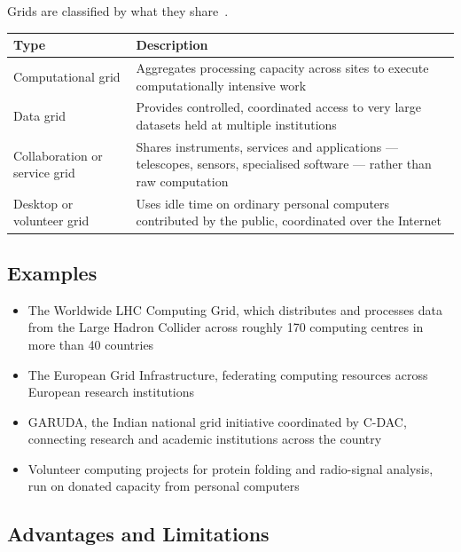 Grids are classified by what they share~.

\begin{center}
\begin{tabularx}{\textwidth}{@{}p{4.2cm}L@{}}
\toprule
\textbf{Type} & \textbf{Description} \\
\midrule
Computational grid & Aggregates processing capacity across sites to execute
  computationally intensive work \\
Data grid & Provides controlled, coordinated access to very large datasets
  held at multiple institutions \\
Collaboration or service grid & Shares instruments, services and
  applications --- telescopes, sensors, specialised software --- rather than
  raw computation \\
Desktop or volunteer grid & Uses idle time on ordinary personal computers
  contributed by the public, coordinated over the Internet \\
\bottomrule
\end{tabularx}
\end{center}


\subsection{Examples}

\begin{itemize}
  \item The Worldwide LHC Computing Grid, which distributes and processes
        data from the Large Hadron Collider across roughly 170 computing
        centres in more than 40 countries~
  \item The European Grid Infrastructure, federating computing resources
        across European research institutions~
  \item GARUDA, the Indian national grid initiative coordinated by C-DAC,
        connecting research and academic institutions across the
        country~
  \item Volunteer computing projects for protein folding and radio-signal
        analysis, run on donated capacity from personal computers
\end{itemize}

\subsection{Advantages and Limitations}

